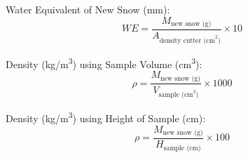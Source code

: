 \documentclass{article}
\begin{document}
Water Equivalent of New Snow (mm):
\begin{equation}
WE = \frac{M_{\text{new snow (g)}}}{A_{\text{density cutter (cm}^2\text{)}}} \times 10
\end{equation}

Density (kg/m\textsuperscript{3}) using Sample Volume (cm\textsuperscript{3}):
\begin{equation}
\rho = \frac{M_{\text{new snow (g)}}}{V_{\text{sample (cm}^3\text{)}}} \times 1000
\end{equation}

Density (kg/m\textsuperscript{3}) using Height of Sample (cm):
\begin{equation}
\rho = \frac{M_{\text{new snow (g)}}}{H_{\text{sample (cm)}}} \times 100
\end{equation}
\end{document}
